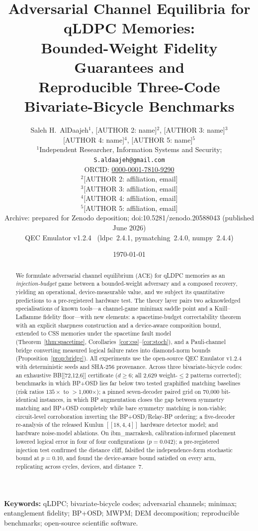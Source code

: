 \documentclass[11pt,a4paper]{article}
\title{Adversarial Channel Equilibria for qLDPC Memories:\\
Bounded-Weight Fidelity Guarantees and\\
Reproducible Three-Code Bivariate-Bicycle Benchmarks}
\author{Saleh H.\ AlDaajeh$^{1}$, [AUTHOR 2: name]$^{2}$, [AUTHOR 3: name]$^{3}$\\[2pt]
[AUTHOR 4: name]$^{4}$, [AUTHOR 5: name]$^{5}$\\[4pt]
\small $^{1}$Independent Researcher, Information Systems and Security; \texttt{S.aldaajeh@gmail.com}\\
\small ORCID: \href{https://orcid.org/0000-0001-7810-9290}{0000-0001-7810-9290}\\
\small $^{2}$[AUTHOR 2: affiliation, email]\\
\small $^{3}$[AUTHOR 3: affiliation, email]\\
\small $^{4}$[AUTHOR 4: affiliation, email]\\
\small $^{5}$[AUTHOR 5: affiliation, email]\\[4pt]
\small Archive: prepared for Zenodo deposition; doi:10.5281/zenodo.20588043 (published June 2026)\\[2pt]
\small QEC Emulator v1.2.4~\cite{AlDaajeh2026emulator}
(ldpc~2.4.1, pymatching~2.4.0, numpy~2.4.4)}
\date{\today}
\begin{document}
\maketitle

\begin{abstract}
We formulate adversarial channel equilibrium (ACE) for qLDPC memories
as an \emph{injection-budget} game between a bounded-weight adversary
and a composed recovery, yielding an operational, device-measurable
value, and we subject its quantitative predictions to a pre-registered
hardware test. The theory layer pairs two acknowledged specialisations
of known tools---a channel-game minimax saddle point and a
Knill--Laflamme fidelity floor---with new elements: a spacetime-budget
correctability theorem with an explicit sharpness construction and a
device-aware composition bound, extended to CSS memories under the
spacetime fault model (Theorem~\ref{thm:spacetime},
Corollaries~\ref{cor:css}--\ref{cor:stoch}), and a Pauli-channel bridge
converting measured logical failure rates into diamond-norm bounds
(Proposition~\ref{prop:bridge}). All experiments use the open-source
QEC Emulator v1.2.4 with deterministic seeds and SHA-256 provenance.
Across three bivariate-bicycle codes: an exhaustive BB[[72,12,6]]
certificate ($d\ge6$; all 2{,}629 weight-$\le2$ patterns corrected);
benchmarks in which BP+OSD lies far below two tested graphified
matching baselines (risk ratios $135\times$ to $>$1{,}000$\times$); a
pinned seven-decoder paired grid on 70{,}000 bit-identical instances,
in which BP augmentation closes the gap between symmetry matching and
BP+OSD completely while bare symmetry matching is non-viable;
circuit-level corroboration inverting the BP+OSD/Relay-BP ordering; a
five-decoder re-analysis of the released Kunlun $[[18,4,4]]$ hardware
detector model; and hardware noise-model ablations. On
ibm\_marrakesh, calibration-informed placement lowered logical error in
four of four configurations ($p=0.042$); a pre-registered
injection test confirmed the distance cliff, falsified the
independence-form stochastic bound at $p=0.10$, and found the
device-aware bound satisfied on every arm, replicating across cycles,
devices, and distance~7.

\end{abstract}

\noindent\textbf{Keywords:} qLDPC; bivariate-bicycle codes; adversarial
channels; minimax; entanglement fidelity; BP+OSD; MWPM; DEM decomposition;
reproducible benchmarks; open-source scientific software.
\end{document}
